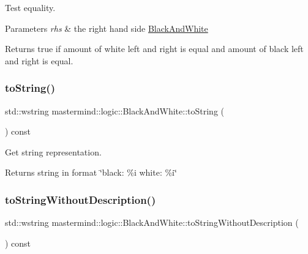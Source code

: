 Test equality. 


\begin{DoxyParams}{Parameters}
{\em rhs} & the right hand side \hyperlink{classmastermind_1_1logic_1_1_black_and_white}{Black\+And\+White} \\
\hline
\end{DoxyParams}
\begin{DoxyReturn}{Returns}
{\ttfamily true} if amount of white left and right is equal and amount of black left and right is equal. 
\end{DoxyReturn}
\hypertarget{classmastermind_1_1logic_1_1_black_and_white_aaa1108efb71702c9cdf6ac9a9ad4a0c9}{}\label{classmastermind_1_1logic_1_1_black_and_white_aaa1108efb71702c9cdf6ac9a9ad4a0c9} 
\subsubsection{\texorpdfstring{to\+String()}{toString()}}
{\footnotesize\ttfamily std\+::wstring mastermind\+::logic\+::\+Black\+And\+White\+::to\+String (\begin{DoxyParamCaption}{ }\end{DoxyParamCaption}) const\hspace{0.3cm}{\ttfamily [virtual]}}



Get string representation. 

\begin{DoxyReturn}{Returns}
string in format \char`\"{}black\+: \%i white\+: \%i\char`\"{} 
\end{DoxyReturn}
\hypertarget{classmastermind_1_1logic_1_1_black_and_white_a38779882fc72d356a660026e047eafb9}{}\label{classmastermind_1_1logic_1_1_black_and_white_a38779882fc72d356a660026e047eafb9} 
\subsubsection{\texorpdfstring{to\+String\+Without\+Description()}{toStringWithoutDescription()}}
{\footnotesize\ttfamily std\+::wstring mastermind\+::logic\+::\+Black\+And\+White\+::to\+String\+Without\+Description (\begin{DoxyParamCaption}{ }\end{DoxyParamCaption}) const}



